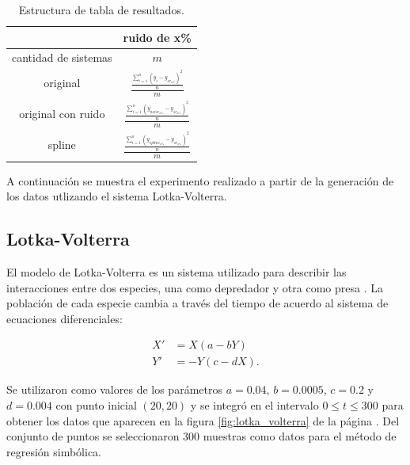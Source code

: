 \begin{table}
    \centering
    \caption{Estructura de tabla de resultados.}
    \begin{tabular}{|c|c|}
        \hline
                             & \textbf{ruido de x\%}                                                \\
        \hline
        cantidad de sistemas & $m$                                                                  \\
        \hline
        original             & $\frac{\frac{\sum_{i=1}^n (y_i-y_{sr_{x\%}})^2}{n}}{m}$              \\
        \hline
        original con ruido   & $\frac{\frac{\sum_{i=1}^n (y_{noise_{x\%}}-y_{sr_{x\%}})^2}{n}}{m}$  \\
        \hline
        spline               & $\frac{\frac{\sum_{i=1}^n (y_{spline_{x\%}}-y_{sr_{x\%}})^2}{n}}{m}$ \\
        \hline
    \end{tabular}
    \label{table:experiment_form}
\end{table}

A continuación se muestra el experimento realizado a partir de la generación de los datos utlizando el sistema Lotka-Volterra.

\subsection{Lotka-Volterra}

El modelo de Lotka-Volterra es un sistema utilizado para describir las interacciones entre dos especies, una como depredador y otra como presa \cite{Hoppensteadt:2006}. La población de cada especie cambia a través del tiempo de acuerdo al sistema de ecuaciones diferenciales:

\begin{align*}
    X' & = X (a - b Y)   \\
    Y' & = -Y (c - d X).
\end{align*}

Se utilizaron como valores de los parámetros $a = 0.04$, $b = 0.0005$, $c = 0.2$ y $d = 0.004$ con punto inicial $(20, 20)$ y se integró en el intervalo $0 \leq t \leq 300$ para obtener los datos que aparecen en la figura \ref{fig:lotka_volterra} de la página \pageref{fig:lotka_volterra}. Del conjunto de puntos se seleccionaron 300 muestras como datos para el método de regresión simbólica.


